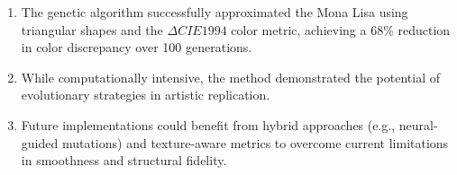 \begin{enumerate}[partopsep=0pt,itemsep=0pt,leftmargin=0.4cm,label=\protect\circled{\arabic*}]
    \item The genetic algorithm successfully approximated the Mona Lisa using triangular shapes and the $\Delta CIE1994$ color metric, achieving a 68\%
          reduction in color discrepancy over 100 generations.
    \item While computationally intensive, the method demonstrated the potential of evolutionary strategies in artistic replication.
    \item Future implementations could benefit from hybrid approaches (e.g., neural-guided mutations) and texture-aware metrics to overcome current limitations in smoothness and structural fidelity.
\end{enumerate}

